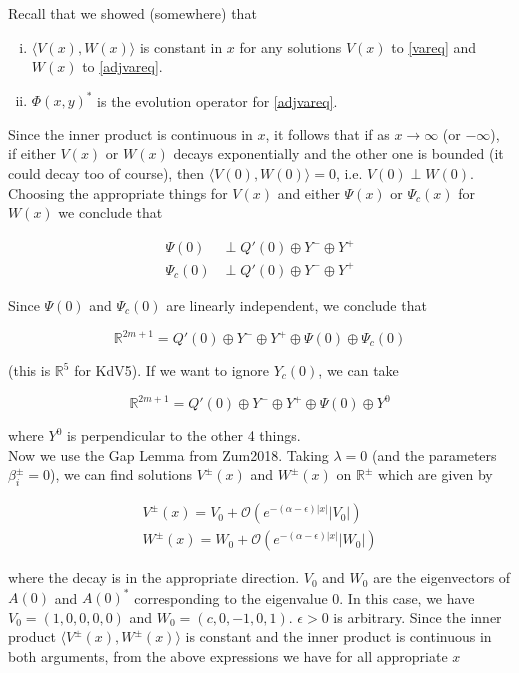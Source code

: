 \documentclass[12pt]{article}
\def\R{{\mathbb R}}
\begin{document}
Recall that we showed (somewhere) that

\begin{enumerate}[(i)]
\item $\langle V(x), W(x) \rangle$ is constant in $x$ for any solutions $V(x)$ to \eqref{vareq} and $W(x)$ to \eqref{adjvareq}.
\item $\Phi(x, y)^*$ is the evolution operator for \eqref{adjvareq}.
\end{enumerate}

Since the inner product is continuous in $x$, it follows that if as $x \rightarrow \infty$ (or $-\infty$), if either $V(x)$ or $W(x)$ decays exponentially and the other one is bounded (it could decay too of course), then $\langle V(0), W(0) \rangle = 0$, i.e. $V(0) \perp W(0)$. Choosing the appropriate things for $V(x)$ and either $\Psi(x)$ or $\Psi_c(x)$ for $W(x)$ we conclude that

\begin{align*}
\Psi(0) &\perp Q'(0) \oplus Y^- \oplus Y^+ \\
\Psi_c(0) &\perp Q'(0) \oplus Y^- \oplus Y^+
\end{align*}

Since $\Psi(0)$ and $\Psi_c(0)$ are linearly independent, we conclude that 

\[
\R^{2m + 1} = Q'(0) \oplus Y^- \oplus Y^+ \oplus \Psi(0) \oplus \Psi_c(0) 
\]

(this is $\R^5$ for KdV5). If we want to ignore $Y_c(0)$, we can take

\[
\R^{2m + 1} = Q'(0) \oplus Y^- \oplus Y^+ \oplus \Psi(0) \oplus Y^0 
\]

where $Y^0$ is perpendicular to the other 4 things.\\

Now we use the Gap Lemma from Zum2018. Taking $\lambda = 0$ (and the parameters $\beta_i^\pm = 0$), we can find solutions $V^\pm(x)$ and $W^\pm(x)$ on $\R^\pm$ which are given by

\begin{align*}
V^\pm(x) = V_0 + \mathcal{O}(e^{-(\alpha - \epsilon)|x|}|V_0|) \\
W^\pm(x) = W_0 + \mathcal{O}(e^{-(\alpha - \epsilon)|x|}|W_0|)
\end{align*}

where the decay is in the appropriate direction. $V_0$ and $W_0$ are the eigenvectors of $A(0)$ and $A(0)^*$ corresponding to the eigenvalue 0. In this case, we have $V_0 = (1, 0, 0, 0, 0)$ and $W_0 = (c, 0, -1, 0, 1)$. $\epsilon > 0$ is arbitrary. Since the inner product $\langle V^\pm(x), W^\pm(x) \rangle$ is constant and the inner product is continuous in both arguments, from the above expressions we have for all appropriate $x$
\end{document}

